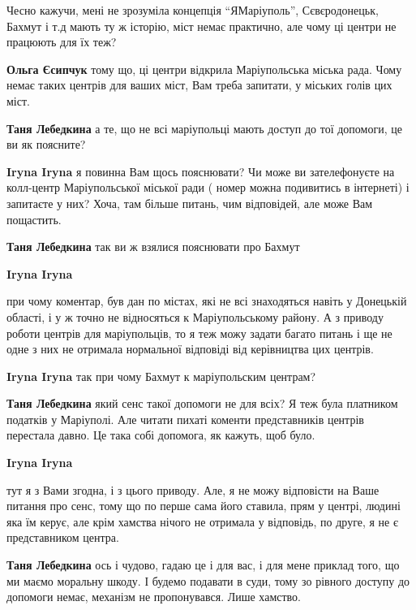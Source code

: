 
Чесно кажучи, мені не зрозуміла концепція \enquote{ЯМаріуполь}, Сєвєродонецьк, Бахмут
і т.д мають ту ж історію, міст немає практично, але чому ці центри не працюють
для їх теж?

\begin{itemize} %
\textbf{Ольга Єсипчук} тому що, ці центри відкрила Маріупольська міська рада. Чому немає таких центрів для ваших міст, Вам треба запитати, у міських голів цих міст.

\textbf{Таня Лебедкина} а те, що не всі маріупольці мають доступ до тої допомоги, це ви як поясните?

\textbf{Iryna Iryna} я повинна Вам щось пояснювати? Чи може ви зателефонуєте на колл-центр Маріупольської міської ради ( номер можна подивитись в інтернеті) і запитаєте у них? Хоча, там більше питань, чим відповідей, але може Вам пощастить.

\textbf{Таня Лебедкина} так ви ж взялися пояснювати про Бахмут

\textbf{Iryna Iryna} 

при чому коментар, був дан по містах, які не всі знаходяться навіть у Донецькій
області, і у ж точно не відносяться к Маріупольському району. А з приводу
роботи центрів для маріупольців, то я теж можу задати багато питань і ще не
одне з них не отримала нормальної відповіді від керівництва цих центрів.

\textbf{Iryna Iryna} так при чому Бахмут к маріупольским центрам?

\textbf{Таня Лебедкина} який сенс такої допомоги не для всіх?
Я теж була платником податків у Маріуполі.
Але читати пихаті коменти представників центрів перестала давно.
Це така собі допомога, як кажуть, щоб було.

\textbf{Iryna Iryna} 

тут я з Вами згодна, і з цього приводу. Але, я не можу відповісти на Ваше
питання про сенс, тому що по перше сама його ставила, прям у центрі, людині яка
їм керує, але крім хамства нічого не отримала у відповідь, по друге, я не є
представником центра.

\textbf{Таня Лебедкина} ось і чудово, гадаю це і для вас, і для мене приклад того, що ми маємо моральну шкоду. І будемо подавати в суди, тому зо рівного доступу до допомоги немає, механізм не пропонувався. Лише хамство.


\end{itemize}
